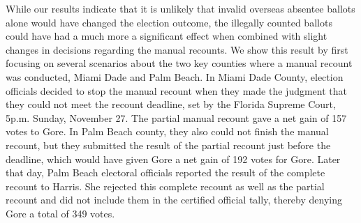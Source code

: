 \documentclass[11pt,titlepage]{article}
\begin{document}
While our results indicate that it is unlikely that invalid overseas
absentee ballots alone would have changed the election outcome, the
illegally counted ballots could have had a much more a significant
effect when combined with slight changes in decisions regarding the
manual recounts.  We show this result by first focusing on several
scenarios about the two key counties where a manual recount was
conducted, Miami Dade and Palm Beach. In Miami Dade County, election
officials decided to stop the manual recount when they made the
judgment that they could not meet the recount deadline, set by the
Florida Supreme Court, 5p.m.  Sunday, November 27.  The partial manual
recount gave a net gain of 157 votes to Gore. In Palm Beach county,
they also could not finish the manual recount, but they
submitted the result of the partial recount just before the deadline,
which would have given Gore a net gain of 192 votes for
Gore. Later that day, Palm Beach
electoral officials reported the result of the complete recount to
Harris.  She rejected this complete recount as well as the
partial recount and did not include them in the certified official
tally, thereby denying Gore a total of 349 votes.
\end{document}
